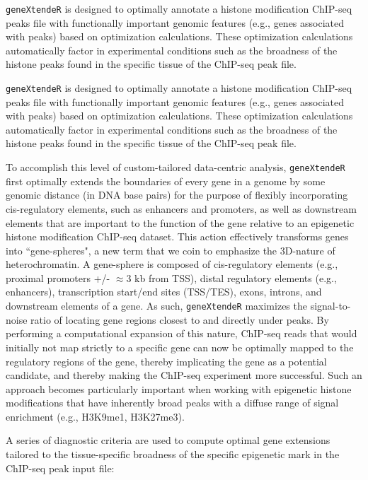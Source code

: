 \documentclass[12pt]{article}
\begin{document}
\texttt{geneXtendeR} is designed to optimally annotate a histone modification ChIP-seq peaks file with functionally important genomic features (e.g., genes associated with peaks) based on optimization calculations.  These optimization calculations automatically factor in experimental conditions such as the broadness of the histone peaks found in the specific tissue of the ChIP-seq peak file.

\texttt{geneXtendeR} is designed to optimally annotate a histone modification ChIP-seq peaks file with functionally important genomic features (e.g., genes associated with peaks) based on optimization calculations.  These optimization calculations automatically factor in experimental conditions such as the broadness of the histone peaks found in the specific tissue of the ChIP-seq peak file.  

To accomplish this level of custom-tailored data-centric analysis, \texttt{geneXtendeR} first optimally extends the boundaries of every gene in a genome by some genomic distance (in DNA base pairs) for the purpose of flexibly incorporating cis-regulatory elements, such as enhancers and promoters, as well as downstream elements that are important to the function of the gene relative to an epigenetic histone modification ChIP-seq dataset.  This action effectively transforms genes into ``gene-spheres", a new term that we coin to emphasize the 3D-nature of heterochromatin.  A gene-sphere is composed of cis-regulatory elements (e.g., proximal promoters +/- $\approx 3$ kb from TSS), distal regulatory elements (e.g., enhancers), transcription start/end sites (TSS/TES), exons, introns, and downstream elements of a gene.  As such, \texttt{geneXtendeR} maximizes the signal-to-noise ratio of locating gene regions closest to and directly under peaks. By performing a computational expansion of this nature, ChIP-seq reads that would initially not map strictly to a specific gene can now be optimally mapped to the regulatory regions of the gene, thereby implicating the gene as a potential candidate, and thereby making the ChIP-seq experiment more successful. Such an approach becomes particularly important when working with epigenetic histone modifications that have inherently broad peaks with a diffuse range of signal enrichment (e.g., H3K9me1, H3K27me3). 

A series of diagnostic criteria are used to compute optimal gene extensions tailored to the tissue-specific broadness of the specific epigenetic mark in the ChIP-seq peak input file:
\end{document}
